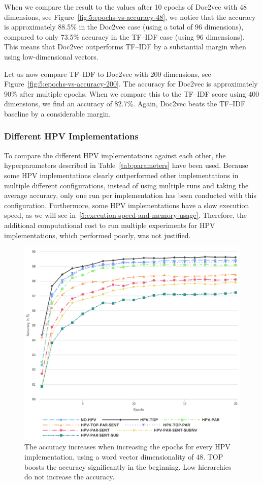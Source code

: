 When we compare the result to the values after 10 epochs of Doc2vec with 48 dimensions, see Figure~\ref{fig:5:epochs-vs-accuracy-48}, we notice that the accuracy is approximately 88.5\% in the Doc2vec case (using a total of 96 dimensions), compared to only 73.5\% accuracy in the TF--IDF case (using 96 dimensions). This means that Doc2vec outperforms TF--IDF by a substantial margin when using low-dimensional vectors.

Let us now compare TF--IDF to Doc2vec with 200 dimensions, see Figure~\ref{fig:5:epochs-vs-accuracy-200}. The accuracy for Doc2vec is approximately 90\% after multiple epochs. When we compare this to the TF--IDF score using 400 dimensions, we find an accuracy of 82.7\%. Again, Doc2vec beats the TF--IDF baseline by a considerable margin.

\subsubsection{Different HPV Implementations}

To compare the different HPV implementations against each other, the hyperparameters described in Table~\ref{tab:parameters} have been used. Because some HPV implementations clearly outperformed other implementations in multiple different configurations, instead of using multiple runs and taking the average accuracy, only one run per implementation has been conducted with this configuration. Furthermore, some HPV implementations have a slow execution speed, as we will see in~\ref{5:execution-speed-and-memory-usage}. Therefore, the additional computational cost to run multiple experiments for HPV implementations, which performed poorly, was not justified.

\begin{figure}
	\centering
	\includegraphics[width=1.0\textwidth]{5experiments/hpv-implementations}
	\caption{The accuracy increases when increasing the epochs for every HPV implementation, using a word vector dimensionality of 48. TOP boosts the accuracy significantly in the beginning. Low hierarchies do not increase the accuracy.}
	\label{fig:5:hpv-implementations}
\end{figure}

